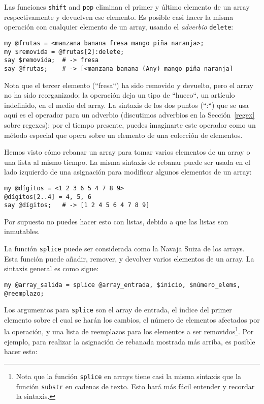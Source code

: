 Las funciones {\tt shift} and {\tt pop} eliminan el primer
y último elemento de un array respectivamente y devuelven
ese elemento. Es posible casi hacer la misma operación
con cualquier elemento de un array, usando el \emph{adverbio}
{\tt delete}:

\begin{lstlisting}
my @frutas = <manzana banana fresa mango piña naranja>;
my $removida = @frutas[2]:delete; 
say $removida;  # -> fresa
say @frutas;    # -> [<manzana banana (Any) mango piña naranja]
\end{lstlisting}

Nota que el tercer elemento (``fresa``) ha sido removido
y devuelto, pero el array no ha sido reorganizado; la operación
deja un tipo de ``hueco``, un artículo indefinido, en el medio
del array. La sintaxis de los dos puntos (``:``) que se usa aquí es 
el operador para un adverbio (discutimos adverbios en la 
Sección~\ref{regex} sobre regexes); por el tiempo presente, puedes
imaginarte este operador como un método especial que opera sobre un
elemento de una colección de elementos.

Hemos visto cómo rebanar un array para tomar varios elementos de
un array o una lista al mismo tiempo. La misma sintaxis de 
rebanar puede ser usada en el lado izquierdo de una asignación
para modificar algunos elementos de un array:

\begin{lstlisting}
my @dígitos = <1 2 3 6 5 4 7 8 9>
@dígitos[2..4] = 4, 5, 6
say @dígitos;   # -> [1 2 4 5 6 4 7 8 9]
\end{lstlisting}

Por supuesto no puedes hacer esto con listas, debido a que
las listas son inmutables.

La función {\tt splice} puede ser considerada como la Navaja Suiza
de los arrays. Esta función puede añadir, remover, y devolver varios 
elementos de un array. La sintaxis general es como sigue:

\begin{lstlisting}
my @array_salida = splice @array_entrada, $inicio, $número_elems, @reemplazo;
\end{lstlisting}
%
Los argumentos para {\tt splice} son el array de entrada, el
índice del primer elemento sobre el cual se harán los cambios,
el número de elementos afectados por la operación, y una lista
de reemplazos para los elementos a ser removidos\footnote{
Nota que la función {\tt splice} en arrays tiene casi la misma
sintaxis que la función {\tt substr} en cadenas de texto. Esto
hará más fácil entender y recordar la sintaxis.}. Por ejemplo, 
para realizar la asignación de rebanada mostrada más arriba, es 
posible hacer esto:

